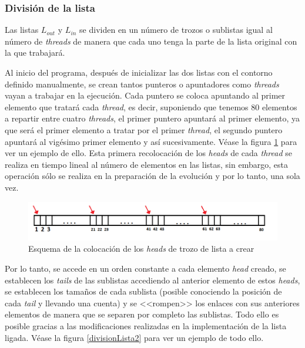 \subsubsection{Divisi\'{o}n de la lista}

Las listas $L_{out}$ y $L_{in}$ se dividen en un n\'{u}mero de trozos o sublistas igual al n\'{u}mero de \textit{threads} de manera que cada uno tenga la parte de la lista original con la que trabajar\'{a}. 

Al inicio del programa, despu\'{e}s de inicializar las dos listas con el contorno definido manualmente, se crean tantos punteros o apuntadores como \textit{threads} vayan a trabajar en la ejecuci\'{o}n. Cada puntero se coloca apuntando al primer elemento que tratar\'{a} cada \textit{thread}, es decir, suponiendo que tenemos 80 elementos a repartir entre cuatro \textit{threads}, el primer puntero apuntar\'{a} al primer elemento, ya que ser\'{a} el primer elemento a tratar por el primer \textit{thread}, el segundo puntero apuntar\'{a} al vig\'{e}simo primer elemento y as\'{i} sucesivamente. V\'{e}ase la figura \ref{divisionLista1} para ver un ejemplo de ello. Esta primera recolocaci\'{o}n de los \textit{heads} de cada \textit{thread} se realiza en tiempo lineal al n\'{u}mero de elementos en las listas, sin embargo, esta operaci\'{o}n s\'{o}lo se realiza en la preparaci\'{o}n de la evoluci\'{o}n y por lo tanto, una sola vez. 

 \begin{figure}[H]
 	\captionsetup{justification=centering}
 	\centering
 	\includegraphics[width=1\textwidth]{./imagenes/divisionLista1}
 	\caption{Esquema de la colocaci\'{o}n de los \textit{heads} de trozo de lista a crear}	
 	\label{divisionLista1}
 \end{figure}
 
 
Por lo tanto, se accede en un orden constante a cada elemento \textit{head} creado, se establecen los \textit{tails} de las sublistas accediendo al anterior elemento de estos \textit{heads}, se establecen los tama\~{n}os de cada sublista (posible conociendo la posici\'{o}n de cada \textit{tail} y llevando una cuenta) y se <<rompen>> los enlaces con sus anteriores elementos de manera que se separen por completo las sublistas. Todo ello es posible gracias a las modificaciones realizadas en la implementaci\'{o}n de la lista ligada. V\'{e}ase la figura \ref{divisionLista2} para ver un ejemplo de todo ello. 

